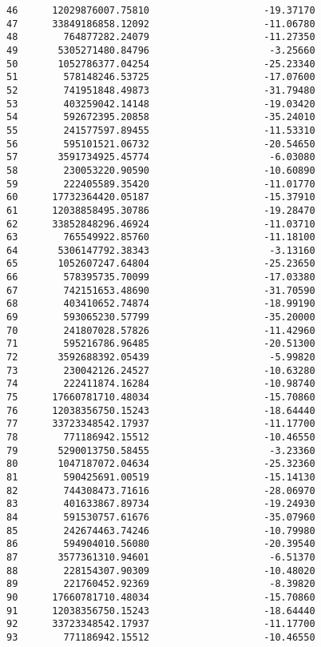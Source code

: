 \documentclass[11pt]{article}
\begin{document}
\begin{tcolorbox}[breakable, size=fbox, boxrule=.5pt, pad at break*=1mm, opacityfill=0]
\begin{Verbatim}[commandchars=\\\{\}]
46      12029876007.75810                    -19.37170
47      33849186858.12092                    -11.06780
48        764877282.24079                    -11.27350
49       5305271480.84796                     -3.25660
50       1052786377.04254                    -25.23340
51        578148246.53725                    -17.07600
52        741951848.49873                    -31.79480
53        403259042.14148                    -19.03420
54        592672395.20858                    -35.24010
55        241577597.89455                    -11.53310
56        595101521.06732                    -20.54650
57       3591734925.45774                     -6.03080
58        230053220.90590                    -10.60890
59        222405589.35420                    -11.01770
60      17732364420.05187                    -15.37910
61      12038858495.30786                    -19.28470
62      33852848296.46924                    -11.03710
63        765549922.85760                    -11.18100
64       5306147792.38343                     -3.13160
65       1052607247.64804                    -25.23650
66        578395735.70099                    -17.03380
67        742151653.48690                    -31.70590
68        403410652.74874                    -18.99190
69        593065230.57799                    -35.20000
70        241807028.57826                    -11.42960
71        595216786.96485                    -20.51300
72       3592688392.05439                     -5.99820
73        230042126.24527                    -10.63280
74        222411874.16284                    -10.98740
75      17660781710.48034                    -15.70860
76      12038356750.15243                    -18.64440
77      33723348542.17937                    -11.17700
78        771186942.15512                    -10.46550
79       5290013750.58455                     -3.23360
80       1047187072.04634                    -25.32360
81        590425691.00519                    -15.14130
82        744308473.71616                    -28.06970
83        401633867.89734                    -19.24930
84        591530757.61676                    -35.07960
85        242674463.74246                    -10.79980
86        594904010.56080                    -20.39540
87       3577361310.94601                     -6.51370
88        228154307.90309                    -10.48020
89        221760452.92369                     -8.39820
90      17660781710.48034                    -15.70860
91      12038356750.15243                    -18.64440
92      33723348542.17937                    -11.17700
93        771186942.15512                    -10.46550

\end{Verbatim}
\end{tcolorbox}
\end{document}

